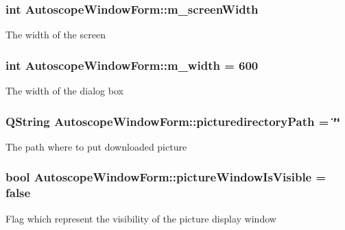 \subsubsection[{\texorpdfstring{m\+\_\+screen\+Width}{m_screenWidth}}]{\setlength{\rightskip}{0pt plus 5cm}int Autoscope\+Window\+Form\+::m\+\_\+screen\+Width\hspace{0.3cm}{\ttfamily [private]}}\hypertarget{class_autoscope_window_form_a6a4204832945288b420ae248dc69ae08}{}\label{class_autoscope_window_form_a6a4204832945288b420ae248dc69ae08}
The width of the screen 
\subsubsection[{\texorpdfstring{m\+\_\+width}{m_width}}]{\setlength{\rightskip}{0pt plus 5cm}int Autoscope\+Window\+Form\+::m\+\_\+width = 600\hspace{0.3cm}{\ttfamily [private]}}\hypertarget{class_autoscope_window_form_a494735b51d06bfa71d5954da50f51d3d}{}\label{class_autoscope_window_form_a494735b51d06bfa71d5954da50f51d3d}
The width of the dialog box 
\subsubsection[{\texorpdfstring{picturedirectory\+Path}{picturedirectoryPath}}]{\setlength{\rightskip}{0pt plus 5cm}Q\+String Autoscope\+Window\+Form\+::picturedirectory\+Path = \char`\"{}\char`\"{}\hspace{0.3cm}{\ttfamily [private]}}\hypertarget{class_autoscope_window_form_a2e8d5a43841204d931654d255e194e60}{}\label{class_autoscope_window_form_a2e8d5a43841204d931654d255e194e60}
The path where to put downloaded picture 
\subsubsection[{\texorpdfstring{picture\+Window\+Is\+Visible}{pictureWindowIsVisible}}]{\setlength{\rightskip}{0pt plus 5cm}bool Autoscope\+Window\+Form\+::picture\+Window\+Is\+Visible = false\hspace{0.3cm}{\ttfamily [private]}}\hypertarget{class_autoscope_window_form_a0a27bb2073810e25351a6dc773f128df}{}\label{class_autoscope_window_form_a0a27bb2073810e25351a6dc773f128df}
Flag which represent the visibility of the picture display window 
